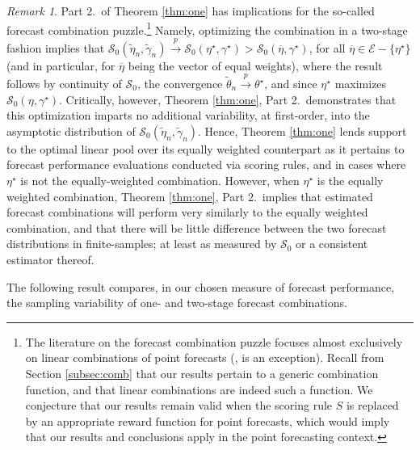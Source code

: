 \documentclass[12pt]{article}
\theoremstyle{definition}
\theoremstyle{remark}
\newtheorem{remark}{Remark}
\begin{document}
\begin{remark}
Part 2.\ of Theorem \ref{thm:one} has implications for the so-called forecast combination puzzle.\footnote{The literature on the forecast combination puzzle focuses almost exclusively on linear combinations of point forecasts (\citealp{Martin2021}, is an exception). Recall from Section \ref{subsec:comb} that our results pertain to a generic combination function, and that linear combinations are indeed such a function. We conjecture that our results remain valid when the scoring rule $S$ is replaced by an appropriate reward function for point forecasts, which would imply that our results and conclusions apply in the point forecasting context.} Namely, optimizing the combination in a two-stage fashion implies that $\mathcal{S}_{0}(\tilde{\eta}_{n}, \tilde{\gamma}_{n}) \overset{p}{\rightarrow} \mathcal{S}_{0}(\eta^{\star}, \gamma^{\star}) > \mathcal{S}_{0}(\overline{\eta}, \gamma^{\star})$, for all $\overline{\eta} \in \mathcal{E} - \{\eta^{\star}\}$ (and in particular, for $\overline{\eta}$ being the vector of equal weights), where the result follows by continuity of $\mathcal{S}_{0}$, the convergence $\tilde{\theta}_{n} \overset{p}{\rightarrow} \theta^{\star}$, and since $\eta^{\star}$ maximizes $\mathcal{S}_{0}(\eta, \gamma^{\star })$. Critically, however, Theorem \ref{thm:one}, Part 2.\ demonstrates that this optimization imparts no additional variability, at first-order, into the asymptotic distribution of $\mathcal{S}_{0}(\tilde{\eta}_{n},\tilde{\gamma}_{n})$. Hence, Theorem \ref{thm:one} lends support to the optimal linear pool over its equally weighted counterpart as it pertains to forecast performance evaluations conducted via scoring rules, and in cases where $\eta ^{\star }$ is not the equally-weighted combination. However, when $\eta^{\star}$ is the equally weighted combination, Theorem \ref{thm:one}, Part 2.\ implies that estimated forecast combinations will perform very similarly to the equally weighted combination, and {that }there will be little difference between the two forecast distributions in finite-samples; at least as measured by $\mathcal{S}_{0}$ or a consistent estimator thereof.
\end{remark}

The following result compares, in our chosen measure of forecast performance, the sampling variability of one- and two-stage forecast combinations.
\end{document}
